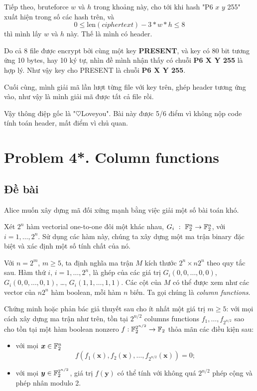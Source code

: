 Tiếp theo, bruteforce $w$ và $h$ trong khoảng này, cho tới khi hash "P6 $x$ $y$ 255" xuất hiện trong số các hash trên, và \[ 0 \leqslant \text{len} (ciphertext) - 3 * w * h \leqslant 8 \] thì mình lấy $w$ và $h$ này. Thế là mình có header.

Do cả 8 file được encrypt bởi cùng một key \textbf{PRESENT}, và key có 80 bit tương ứng 10 bytes, hay 10 ký tự, nhìn đề mình nhận thấy có chuỗi \textbf{P6 X Y 255} là hợp lý. Như vậy key cho PRESENT là chuỗi \textbf{P6 X Y 255}.

Cuối cùng, mình giải mã lần lượt từng file với key trên, ghép header tương ứng vào, như vậy là mình giải mã được tất cả file rồi.

Vậy thông điệp gốc là "$\heartsuit$Loveyou". Bài này được 5/6 điểm vì không nộp code tính toán header, mất điểm vì chủ quan.

\section*{Problem 4*. Column functions}

\subsection*{Đề bài}

Alice muốn xây dựng mã đối xứng mạnh bằng việc giải một số bài toán khó.

Xét $2^n$ hàm vectorial one-to-one đôi một khác nhau, $G_i \ : \ \mathbb{F}_2^n \to \mathbb{F}_2^n$, với $i = 1, \ldots, 2^n$. Sử dụng các hàm này, chúng ta xây dựng một ma trận binary đặc biệt và xác định một số tính chất của nó.

Với $n=2^m$, $m \geqslant 5$, ta định nghĩa ma trận $M$ kích thước $2^n \times n 2^n$ theo quy tắc sau. Hàm thứ $i$, $i = 1, \ldots, 2^n$, là ghép của các giá trị $G_i(0, 0, \ldots, 0, 0)$, $G_i(0, 0, \ldots, 0, 1)$, \dots, $G_i(1, 1, \ldots, 1, 1)$. Các cột của $M$ có thể được xem như các vector của $n 2^n$ hàm boolean, mỗi hàm $n$ biến. Ta gọi chúng là \textit{column functions}.

Chứng minh hoặc phản bác giả thuyết sau cho ít nhất một giá trị $m \geqslant 5$: với mọi cách xây dựng ma trận như trên, tồn tại $2^{n/2}$ columns functions $f_1, \ldots, f_{2^{n/2}}$ sao cho tồn tại một hàm boolean nonzero $f: \mathbb{F}_2^{2^{n/2}} \to \mathbb{F}_2$ thỏa mãn các điều kiện sau:

\begin{itemize}
    \item với mọi $\bm{x} \in \mathbb{F}_2^n$
    \begin{equation*}
        f(f_1(\bm{x}), f_2(\bm{x}), \ldots, f_{2^{n/2}}(\bm{x})) = 0;
    \end{equation*}
    \item với mọi $\bm{y} \in \mathbb{F}_2^{2^{n/2}}$, giá trị $f(\bm{y})$ có thể tính với không quá $2^{n/2}$ phép cộng và phép nhân modulo 2.
\end{itemize}

